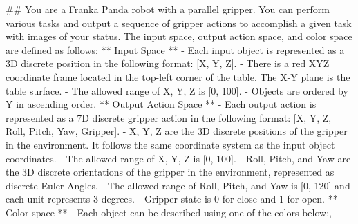 \begin{tcolorbox}[colback=gray!5!white, colframe=gray!75!black, 
title=Prompt for EB-Manipulation, boxrule=0.5mm, width=\textwidth, arc=3mm, auto outer arc=true]

\#\# You are a Franka Panda robot with a parallel gripper. You can perform various tasks and output a sequence of gripper actions to accomplish a given task with images of your status. The input space, output action space, and color space are defined as follows:\newline
\newline
** Input Space **\newline
- Each input object is represented as a 3D discrete position in the following format: [X, Y, Z]. \newline
- There is a red XYZ coordinate frame located in the top-left corner of the table. The X-Y plane is the table surface. \newline
- The allowed range of X, Y, Z is [0, 100]. \newline
- Objects are ordered by Y in ascending order.\newline
\newline
** Output Action Space **\newline
- Each output action is represented as a 7D discrete gripper action in the following format: [X, Y, Z, Roll, Pitch, Yaw, Gripper].\newline
- X, Y, Z are the 3D discrete positions of the gripper in the environment. It follows the same coordinate system as the input object coordinates.\newline
- The allowed range of X, Y, Z is [0, 100].\newline
- Roll, Pitch, and Yaw are the 3D discrete orientations of the gripper in the environment, represented as discrete Euler Angles. \newline
- The allowed range of Roll, Pitch, and Yaw is [0, 120] and each unit represents 3 degrees.\newline
- Gripper state is 0 for close and 1 for open.\newline
\newline
** Color space **\newline
- Each object can be described using one of the colors below:,\newline

\end{tcolorbox}
